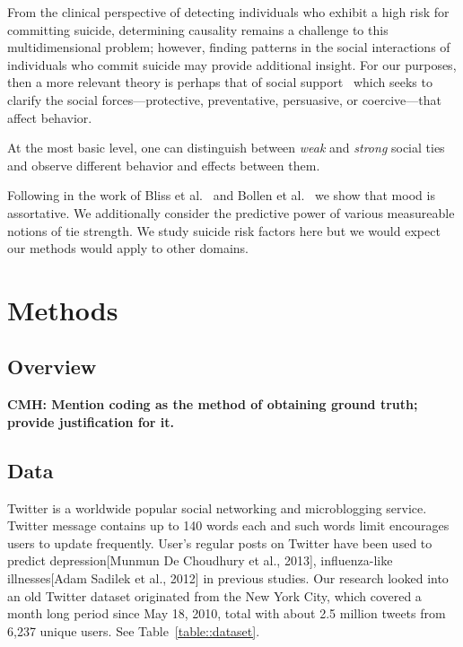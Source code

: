 \documentclass[11pt]{article}
\begin{document}
From the clinical perspective of detecting individuals who exhibit a high risk for committing suicide, determining  causality remains a challenge to this multidimensional problem; however, finding patterns in the social interactions of individuals who commit suicide may provide additional insight. For our purposes, then a more relevant theory is perhaps that of social support~\cite{wellman1990different} which seeks to clarify the social forces---protective, preventative, persuasive, or coercive---that affect behavior. 

At the most basic level, one can distinguish between \emph{weak} and \emph{strong} social ties and observe different behavior and effects between them.  

Following in the work of Bliss et al.~\cite{coviello2014} and Bollen et al.~\cite{bollen2011happiness} we show that 
mood is assortative. We additionally consider the predictive power of various measureable notions of tie strength.
We study suicide risk factors here but we would expect our methods would apply to other domains.



\section{Methods}
\subsection{Overview}
\textbf{CMH: Mention coding as the method of obtaining ground truth; provide justification for it.}
\subsection{Data}
Twitter is a worldwide popular social networking and microblogging service. Twitter message contains up to 140 words each and such words limit encourages users to update frequently. User's regular posts on Twitter have been used to predict depression[Munmun De Choudhury et al., 2013], influenza-like illnesses[Adam Sadilek et al., 2012] in previous studies. Our research looked into an old Twitter dataset originated from the New York City, which covered a month long period since May 18, 2010, total with about 2.5 million tweets from 6,237 unique users. See Table~\ref{table::dataset}.
\end{document}
